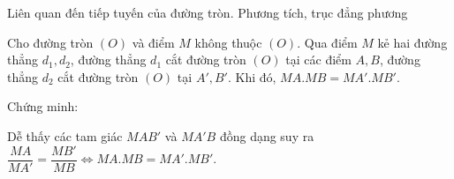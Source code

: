 \begin{dang}
	{Liên quan đến tiếp tuyến của đường tròn. Phương tích, trục đẳng phương}
	\setcounter{tc}{0}
	\begin{dl}
		Cho đường tròn $(O)$ và điểm $M$ không thuộc $(O)$. Qua điểm $M$ kẻ hai đường thẳng $d_1,d_2$, đường thẳng $d_1$ cắt đường tròn $(O)$ tại các điểm $A,B$, đường thẳng $d_2$ cắt đường tròn $(O)$ tại $A',B'$.  Khi đó, $MA.MB=MA'.MB'$. 
	\end{dl}
	Chứng minh: \\
	\begin{minipage}[h]{0.5 \textwidth}
		\begin{center}
		\end{center}
	\end{minipage}
	\begin{minipage}[h]{0.5 \textwidth}
		\begin{center}
		\end{center}
	\end{minipage}
	Dễ thấy các tam giác $MAB'$ và $MA'B$ đồng dạng suy ra $\dfrac{MA}{MA'} = \dfrac{MB'}{MB} \Leftrightarrow MA.MB=MA'.MB'$.
	

\end{dang}
